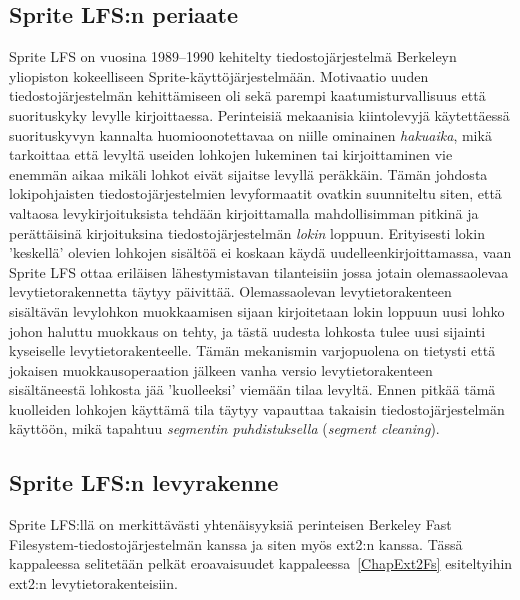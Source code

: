 \subsection{Sprite LFS:n periaate}
Sprite LFS on vuosina 1989--1990 kehitelty tiedostojärjestelmä Berkeleyn yliopiston kokeelliseen Sprite-käyttöjärjestelmään.
Motivaatio uuden tiedostojärjestelmän kehittämiseen oli sekä parempi kaatumisturvallisuus että suorituskyky levylle kirjoittaessa.
Perinteisiä mekaanisia kiintolevyjä käytettäessä suorituskyvyn kannalta huomioonotettavaa on niille ominainen \emph{hakuaika},
mikä tarkoittaa että levyltä useiden lohkojen lukeminen tai kirjoittaminen vie enemmän aikaa mikäli lohkot eivät sijaitse levyllä peräkkäin.
Tämän johdosta lokipohjaisten tiedostojärjestelmien levyformaatit ovatkin suunniteltu siten,
että valtaosa levykirjoituksista tehdään kirjoittamalla mahdollisimman pitkinä ja perättäisinä kirjoituksina tiedostojärjestelmän \emph{lokin} loppuun.
Erityisesti lokin 'keskellä' olevien lohkojen sisältöä ei koskaan käydä uudelleenkirjoittamassa,
vaan Sprite LFS ottaa eriläisen lähestymistavan tilanteisiin jossa jotain olemassaolevaa levytietorakennetta täytyy päivittää.
Olemassaolevan levytietorakenteen sisältävän levylohkon muokkaamisen sijaan kirjoitetaan lokin loppuun uusi lohko johon haluttu muokkaus on tehty,
ja tästä uudesta lohkosta tulee uusi sijainti kyseiselle levytietorakenteelle.
Tämän mekanismin varjopuolena on tietysti että jokaisen muokkausoperaation jälkeen vanha versio levytietorakenteen sisältäneestä lohkosta jää 'kuolleeksi' viemään tilaa levyltä.
Ennen pitkää tämä kuolleiden lohkojen käyttämä tila täytyy vapauttaa takaisin tiedostojärjestelmän käyttöön,
mikä tapahtuu \emph{segmentin puhdistuksella} (\emph{segment cleaning}).

\subsection{Sprite LFS:n levyrakenne}

Sprite LFS:llä on merkittävästi yhtenäisyyksiä perinteisen Berkeley Fast Filesystem-tiedostojärjestelmän kanssa ja siten myös ext2:n kanssa.
Tässä kappaleessa selitetään pelkät eroavaisuudet kappaleessa~\ref{ChapExt2Fs} esiteltyihin ext2:n levytietorakenteisiin.

